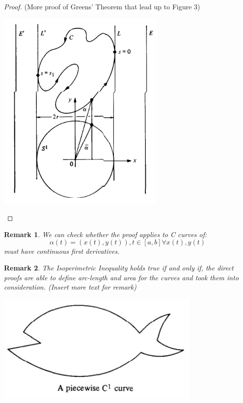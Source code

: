 \documentclass[a4paper]{book}
\newtheorem*{remark*}{Remark}%
\begin{document}
\begin{proof}
    (More proof of Greens' Theorem that lead up to Figure 3)
    \begin{center}
      \includegraphics[height=100mm]{Proof 1 Figure.png}
    \end{center}
\end{proof}

\begin{remark*}
    We can check whether the proof applies to C curves of: 
    \[\alpha(t)=(x(t),y(t)), t\in [a,b] \forall x(t),y(t) \] must have continuous first derivatives.~\cite{do2016differential}
\end{remark*}

\begin{remark*}
    The Isoperimetric Inequality holds true if and only if, the direct proofs are able to define arc-length and area for the curves and took them into consideration. (Insert more text for remark) ~\cite{do2016differential}
\end{remark*}

\begin{center}
  \includegraphics[width=100mm]{2nd Remark Figure.png}
\end{center}
\end{document}
